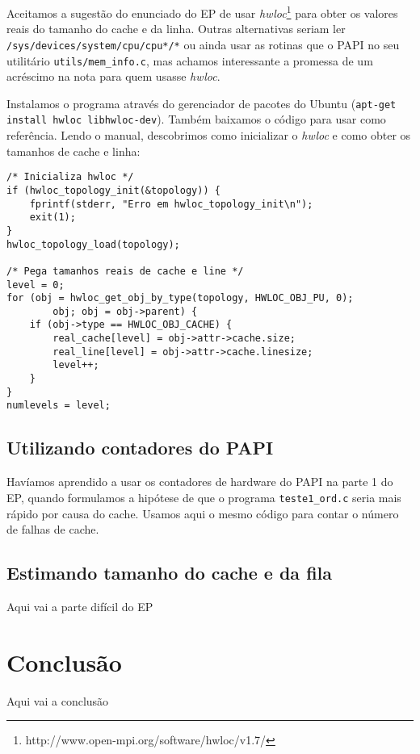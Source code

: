 \documentclass[a4paper,oneside,12pt]{article}
\begin{document}
Aceitamos a sugestão do enunciado do EP de usar \emph{hwloc}\footnote{http://www.open-mpi.org/software/hwloc/v1.7/} para obter os valores reais do tamanho do cache e da linha. Outras alternativas seriam ler {\tt /sys/devices/system/cpu/cpu*/*} ou ainda usar as rotinas que o PAPI no seu utilitário {\tt utils/mem\_info.c}, mas achamos interessante a promessa de um acréscimo na nota para quem usasse \emph{hwloc}.

Instalamos o programa através do gerenciador de pacotes do Ubuntu ({\tt apt-get install hwloc libhwloc-dev}). Também baixamos o código para usar como referência. Lendo o manual, descobrimos como inicializar o \emph{hwloc} e como obter os tamanhos de cache e linha:

\begin{verbatim}
/* Inicializa hwloc */
if (hwloc_topology_init(&topology)) {
    fprintf(stderr, "Erro em hwloc_topology_init\n");
    exit(1);
}
hwloc_topology_load(topology);

/* Pega tamanhos reais de cache e line */
level = 0;
for (obj = hwloc_get_obj_by_type(topology, HWLOC_OBJ_PU, 0);
        obj; obj = obj->parent) {
    if (obj->type == HWLOC_OBJ_CACHE) {
        real_cache[level] = obj->attr->cache.size;
        real_line[level] = obj->attr->cache.linesize;
        level++;
    }
}
numlevels = level;
\end{verbatim}

\subsection{Utilizando contadores do PAPI}

Havíamos aprendido a usar os contadores de hardware do PAPI na parte 1 do EP, quando formulamos a hipótese de que o programa {\tt teste1\_ord.c} seria mais rápido por causa do cache. Usamos aqui o mesmo código para contar o número de falhas de cache.

\subsection{Estimando tamanho do cache e da fila}

Aqui vai a parte difícil do EP %

\section{Conclusão}

Aqui vai a conclusão %
\end{document}
